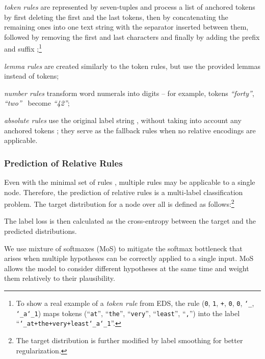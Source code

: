 \documentclass[11pt,a4paper]{article}
\newenvironment{cenumerate}{\begin{list}{\labelenumi}{\usecounter{enumi}\topsep=.2\smallskipamount\itemsep=0pt\parsep=1pt\labelwidth=1.0em}}{\end{list}}
\begin{document}
\begin{cenumerate}
    \item \emph{token rules} are represented by seven-tuples  and process a list of anchored tokens  by first deleting the first  and the last  tokens, then by concatenating the remaining ones into one text string with the separator  inserted between them, followed by removing the first  and last  characters and finally by adding the prefix  and suffix ;\footnote{To show a real example of a \emph{token rule} from EDS, the rule (\texttt{0}, \texttt{1}, \texttt{+}, \texttt{0}, \texttt{0}, \texttt{\char`_}, \texttt{\char`_a\char`_1}) maps tokens (``\texttt{at}'', ``\texttt{the}'', ``\texttt{very}'', ``\texttt{least}'', ``\texttt{,}'') into the label ``\texttt{\char`_at+the+very+least\char`_a\char`_1}''.}
    
    \item \emph{lemma rules} are created similarly to the token rules, but use the provided lemmas instead of tokens;
    
    \item \emph{number rules} transform word numerals into digits -- for example, tokens  \emph{``forty''}, \emph{``two''}~ become \emph{``42''};
    
    \item \emph{absolute rules} use the original label string , without taking into account any anchored tokens ; they serve as the fallback rules when no relative encodings are applicable.
\end{cenumerate}





\subsubsection{Prediction of Relative Rules}
\label{section:mos}

Even with the minimal set of rules , multiple rules may be applicable to a single node. Therefore,
the prediction of relative rules is a multi-label classification problem. The target distribution for a node  over all  is defined as follows:\footnote{The target distribution is further modified by label smoothing \cite{szegedy2016rethinking} for better regularization.}

The label loss  is then calculated as the cross-entropy between the target and the predicted distributions.

We use mixture of softmaxes (MoS) to mitigate the softmax bottleneck \cite{yang2017breaking} that arises when multiple hypotheses can be correctly applied to a single input. MoS allows the model to consider  different hypotheses at the same time and weight them relatively to their plausibility.
\end{document}
